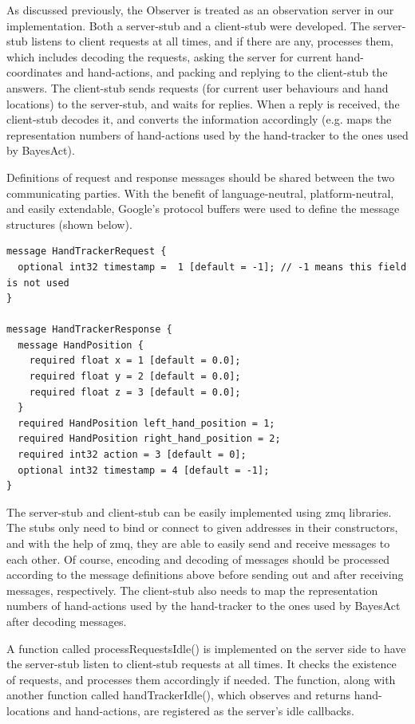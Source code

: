 As discussed previously, the Observer is treated as an observation server in our implementation. Both a server-stub and a client-stub were developed. The server-stub listens to client requests at all times, and if there are any, processes them, which includes decoding the requests, asking the server for current hand-coordinates and hand-actions, and packing and replying to the client-stub the answers. The client-stub sends requests (for current user behaviours and hand locations) to the server-stub, and waits for replies. When a reply is received, the client-stub decodes it, and converts the information accordingly (e.g. maps the representation numbers of hand-actions used by the hand-tracker to the ones used by BayesAct).

Definitions of request and response messages should be shared between the two communicating parties. With the benefit of language-neutral, platform-neutral, and easily extendable, Google's protocol buffers were used to define the message structures (shown below).

\begin{verbatim}
message HandTrackerRequest {
  optional int32 timestamp =  1 [default = -1]; // -1 means this field is not used
}

message HandTrackerResponse {
  message HandPosition {
    required float x = 1 [default = 0.0];
    required float y = 2 [default = 0.0];
    required float z = 3 [default = 0.0];
  }
  required HandPosition left_hand_position = 1;
  required HandPosition right_hand_position = 2;
  required int32 action = 3 [default = 0];
  optional int32 timestamp = 4 [default = -1];
}
\end{verbatim}

The server-stub and client-stub can be easily implemented using zmq libraries. The stubs only need to bind or connect to given addresses in their constructors, and with the help of zmq, they are able to easily send and receive messages to each other. Of course, encoding and decoding of messages should be processed according to the message definitions above before sending out and after receiving messages, respectively. The client-stub also needs to map the representation numbers of hand-actions used by the hand-tracker to the ones used by BayesAct after decoding messages.

A function called processRequestsIdle() is implemented on the server side to have the server-stub listen to client-stub requests at all times. It checks the existence of requests, and processes them accordingly if needed. The function, along with another function called handTrackerIdle(), which observes and returns hand-locations and hand-actions, are registered as the server's idle callbacks.


